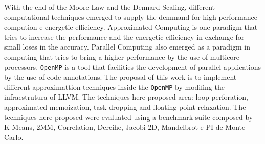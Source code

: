 
\begin{abstractutfpr}%
    With the end of the Moore Law and the Dennard Scaling, different computational techniques emerged to supply the demmand for high performance compution e energetic efficiency. Approximated Computing is one paradigm that tries to increase the performance and the energetic efficiency in exchange for small loses in the accuracy. Parallel Computing also emerged as a paradigm in computing that tries to bring a higher performance by the use of multicore processors. \texttt{OpenMP} is a tool that facilities the development of parallel applications by the use of code annotations. The proposal of this work is to implement different approximattion techniques inside the \texttt{OpenMP} by modifing the infraestrutura of LLVM. The techniques here proposed area: loop perforation, approximated memoization, task dropping and floating point relaxation. The techniques here proposed were evaluated using a benchmark suite composed by K-Means, 2MM, Correlation, Dercihe, Jacobi 2D, Mandelbrot e PI de Monte Carlo.
\end{abstractutfpr}
